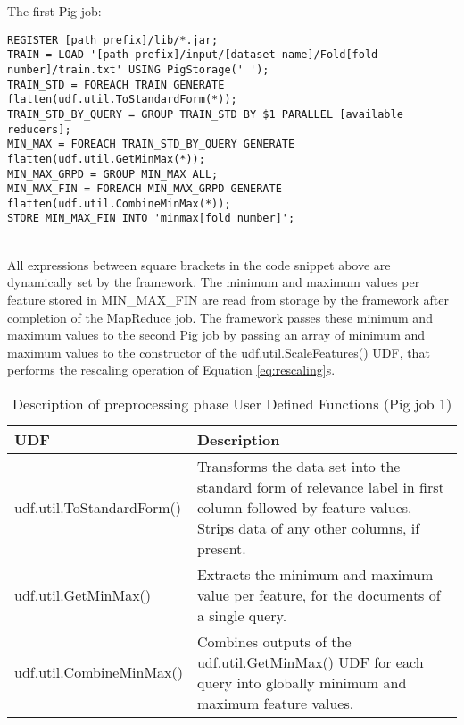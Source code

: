 The first Pig job:\\
\begin{minipage}{\linewidth}
\begin{lstlisting}
REGISTER [path prefix]/lib/*.jar;
TRAIN = LOAD '[path prefix]/input/[dataset name]/Fold[fold number]/train.txt' USING PigStorage(' ');
TRAIN_STD = FOREACH TRAIN GENERATE flatten(udf.util.ToStandardForm(*));
TRAIN_STD_BY_QUERY = GROUP TRAIN_STD BY $1 PARALLEL [available reducers];
MIN_MAX = FOREACH TRAIN_STD_BY_QUERY GENERATE flatten(udf.util.GetMinMax(*));
MIN_MAX_GRPD = GROUP MIN_MAX ALL;
MIN_MAX_FIN = FOREACH MIN_MAX_GRPD GENERATE flatten(udf.util.CombineMinMax(*));
STORE MIN_MAX_FIN INTO 'minmax[fold number]';
\end{lstlisting}
\end{minipage}\\
All expressions between square brackets in the code snippet above are dynamically set by the framework. The minimum and maximum values per feature stored in MIN\_MAX\_FIN are read from storage by the framework after completion of the MapReduce job. The framework passes these minimum and maximum values to the second Pig job by passing an array of minimum and maximum values to the constructor of the udf.util.ScaleFeatures() \ac{UDF}, that performs the rescaling operation of Equation \ref{eq:rescaling}s.\\

\begin{table}
\centering
\begin{tabular}{p{6cm}p{7cm}}\toprule
UDF & Description \\
\midrule
udf.util.ToStandardForm() & Transforms the data set into the standard form of relevance label in first column followed by feature values. Strips data of any other columns, if present.\\
udf.util.GetMinMax() & Extracts the minimum and maximum value per feature, for the documents of a single query.\\
udf.util.CombineMinMax() & Combines outputs of the udf.util.GetMinMax() UDF for each query into globally minimum and maximum feature values.\\
\bottomrule
\end{tabular}
\caption{Description of preprocessing phase User Defined Functions (Pig job 1)}
\label{tbl:preprocessing_udfs_1}
\end{table}

